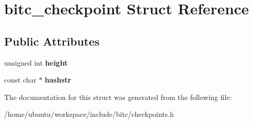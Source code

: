 \hypertarget{structbitc__checkpoint}{\section{bitc\-\_\-checkpoint Struct Reference}
\label{structbitc__checkpoint}
}
\subsection*{Public Attributes}
\begin{DoxyCompactItemize}
\item 
\hypertarget{structbitc__checkpoint_a18df55741921240eee4ab7c37a6c7d0f}{unsigned int {\bfseries height}}\label{structbitc__checkpoint_a18df55741921240eee4ab7c37a6c7d0f}

\item 
\hypertarget{structbitc__checkpoint_a5574d6827773ebffb7fc380bff153921}{const char $\ast$ {\bfseries hashstr}}\label{structbitc__checkpoint_a5574d6827773ebffb7fc380bff153921}

\end{DoxyCompactItemize}


The documentation for this struct was generated from the following file\-:\begin{DoxyCompactItemize}
\item 
/home/ubuntu/workspace/include/bitc/checkpoints.\-h\end{DoxyCompactItemize}
